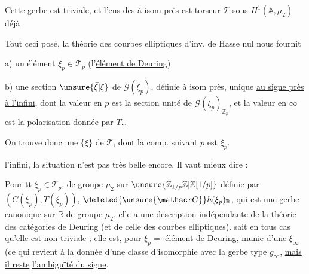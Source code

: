 Cette gerbe est  triviale, et l'ens des  à isom
 près est  torseur $\mathcal T$ sous $H^1(\mathbb A,\mu_2)$ déjà


Tout ceci posé, la théorie  des courbes elliptiques
d'inv. de Hasse nul nous fournit

a) un élément $\xi_p\in\mathcal T_p$ (l'\uline{élément de Deuring})

b) une section  $\unsure{\bar\xi|\xi}$ de $\mathscr G(\xi_p)$, définie
à isom près, unique \uline{au signe près à l'infini},
dont la valeur en $p$  est la section unité
 de $\mathscr G(\xi_p)_{\mathbb Z_p}$, et la valeur en $\infty$ est la
polarisation donnée par $T$\ldots

On trouve donc une  $\{\xi\}$ de $\mathcal T$, dont la
comp. suivant $p$ est $\xi_p$.


 l'infini, la situation n'est pas très belle encore. Il
vaut mieux dire :

Pour tt $\xi_p\in\mathcal T_p$,   de
groupe $\mu_2$ sur $\unsure{\mathbb Z_{1/p}\mathbb Z|\mathbb Z[1/p]}$ définie par $(C(\xi_p),T(\xi_p))$,  
$\deleted{\unsure{\mathscr G}} h(\xi_p)_{\mathbb R}$, qui est une gerbe \uline{canonique} sur $\mathbb R$ de groupe
$\mu_2$.   elle a une description indépendante
de la théorie des catégories de Deuring (et de celle
des courbes elliptiques).  sait en tous cas
qu'elle est non triviale ; elle est, pour $\xi_p=$ élément de Deuring,
munie d'une  $\xi_\infty$ (ce qui revient à la
donnée d'une classe d'isomorphie  avec la gerbe
type $g_\infty$, \uline{mais il reste} \uline{l'ambiguïté du signe}.

